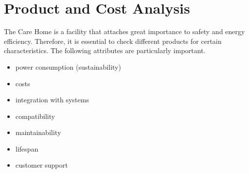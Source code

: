 \chapter{Product and Cost Analysis}
The Care Home is a facility that attaches great importance to safety and energy efficiency. Therefore, it is essential to check different products for certain characteristics. The following attributes are particularly important.
\begin{itemize}
	\item power consumption (sustainability)
	\item costs
	\item integration with systems
	\item compatibility
	\item maintainability
	\item lifespan
	\item customer support 
\end{itemize}

